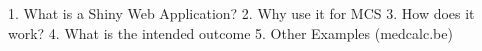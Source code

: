 

1. What is a Shiny Web Application?
2. Why use it for MCS
3. How does it work?
4. What is the intended outcome
5. Other Examples (medcalc.be)

